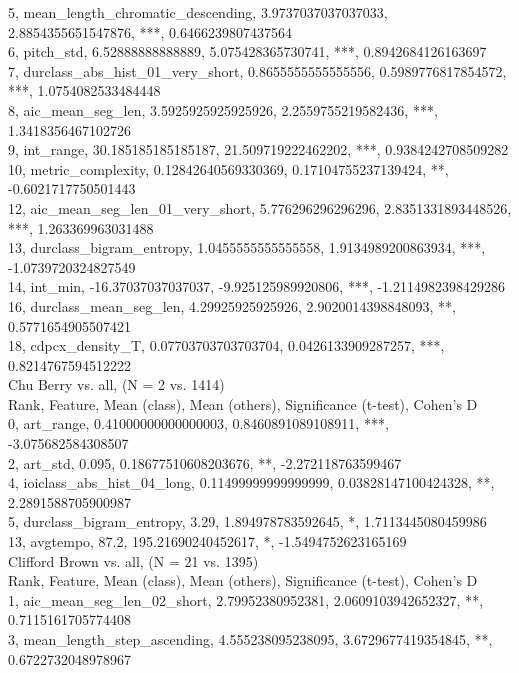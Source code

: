 5, mean_length_chromatic_descending, 3.9737037037037033, 2.8854355651547876, ***, 0.6466239807437564\\
6, pitch_std, 6.52888888888889, 5.075428365730741, ***, 0.8942684126163697\\
7, durclass_abs_hist_01_very_short, 0.8655555555555556, 0.5989776817854572, ***, 1.0754082533484448\\
8, aic_mean_seg_len, 3.5925925925925926, 2.2559755219582436, ***, 1.3418356467102726\\
9, int_range, 30.185185185185187, 21.509719222462202, ***, 0.9384242708509282\\
10, metric_complexity, 0.12842640569330369, 0.17104755237139424, **, -0.6021717750501443\\
12, aic_mean_seg_len_01_very_short, 5.776296296296296, 2.8351331893448526, ***, 1.263369963031488\\
13, durclass_bigram_entropy, 1.0455555555555558, 1.9134989200863934, ***, -1.0739720324827549\\
14, int_min, -16.37037037037037, -9.925125989920806, ***, -1.2114982398429286\\
16, durclass_mean_seg_len, 4.29925925925926, 2.9020014398848093, **, 0.5771654905507421\\
18, cdpcx_density_T, 0.07703703703703704, 0.0426133909287257, ***, 0.8214767594512222\\
Chu Berry vs. all, (N = 2 vs. 1414)\\
Rank, Feature, Mean (class), Mean (others), Significance (t-test), Cohen's D\\
0, art_range, 0.41000000000000003, 0.8460891089108911, ***, -3.075682584308507\\
2, art_std, 0.095, 0.18677510608203676, **, -2.272118763599467\\
4, ioiclass_abs_hist_04_long, 0.11499999999999999, 0.03828147100424328, **, 2.2891588705900987\\
5, durclass_bigram_entropy, 3.29, 1.894978783592645, *, 1.7113445080459986\\
13, avgtempo, 87.2, 195.21690240452617, *, -1.5494752623165169\\
Clifford Brown vs. all, (N = 21 vs. 1395)\\
Rank, Feature, Mean (class), Mean (others), Significance (t-test), Cohen's D\\
1, aic_mean_seg_len_02_short, 2.79952380952381, 2.0609103942652327, **, 0.7115161705774408\\
3, mean_length_step_ascending, 4.555238095238095, 3.6729677419354845, **, 0.6722732048978967\\
